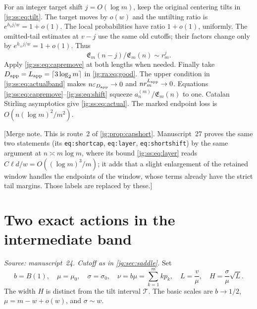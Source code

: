 \documentclass[11pt,a4paper]{article}
\theoremstyle{definition}\newaliascnt{definition}{theorem}
\theoremstyle{remark}\newaliascnt{remark}{theorem}
\newcommand{\eps}{\varepsilon}
\begin{document}
For an integer target shift $j=O(\log m)$, keep the original centering tilts in
\eqref{jg:ss:eq:tilt}. The target moves by $o(w)$ and the untilting ratio is
$e^{h_\ell j/w}=1+o(1)$. The local probabilities have ratio $1+o(1)$,
uniformly. The omitted-tail estimates at $v-j$ use the same old cutoffs; their
factors change only by $e^{h_\pm j/w}=1+o(1)$. Thus
\begin{equation}\label{jg:ss:eq:shift}
 \mathfrak E_m(n-j)/\mathfrak E_m(n)\sim r_m^j.
\end{equation}
Apply \eqref{jg:ss:eq:capremove} at both lengths when needed. Finally take
$D_{\rm app}=L_{\rm app}=\lceil3\log_2m\rceil$ in \eqref{jg:ra:eq:good}. The
upper condition in \eqref{jg:ss:eq:actualband} makes $n\eps_{D_{\rm app}}\to0$
and $nr_m^{L_{\rm app}}\to0$. Equations
\eqref{jg:ss:eq:capremove}--\eqref{jg:ss:eq:shift} squeeze
$a_n^{(m)}/\mathfrak E_m(n)$ to one. Catalan Stirling asymptotics give
\eqref{jg:ss:eq:actual}. The marked endpoint loss is $O(n(\log m)^2/m^2)$.

[Merge note. This is route~2 of \cref{jg:prop:capshort}. Manuscript~27 proves
the same two statements (its \texttt{eq:shortcap}, \texttt{eq:layer},
\texttt{eq:shortshift}) by the same argument at $n\asymp m\log m$, where its
bound \eqref{jg:ss:eq:layer} reads $C\ell d/w=O((\log m)^3/m)$; it adds that a
slight enlargement of the retained window handles the endpoints of the window,
whose terms already have the strict tail margins. Those labels are replaced by
these.]

\section{Two exact actions in the intermediate band}
\label{jg:sec:two}
\emph{Source: manuscript~24. Cutoff as in \cref{jg:sec:saddle}.} Set
\begin{equation}\label{jg:ss:eq:width}
 b=B(1),\quad \mu=\mu_0,\quad\sigma=\sigma_0,\quad
 \nu=b\mu=\sum_{k=1}^m kp_k,\quad
 L=\frac{v}{\mu},\quad H=\frac{\sigma}{\mu}\sqrt L .
\end{equation}
The width $H$ is distinct from the tilt interval $\mathcal T$. The basic scales
are $b\to1/2$, $\mu=m-w+o(w)$, and $\sigma\sim w$.
\end{document}
